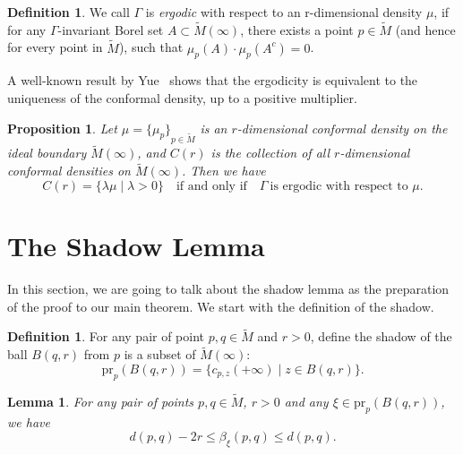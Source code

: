 \documentclass[reqno,11pt]{article}
\newtheorem{proposition}[theorem]{Proposition}
\newtheorem{lemma}[theorem]{Lemma}
\theoremstyle{definition}
\newtheorem{definition}[theorem]{Definition}
\theoremstyle{remark}
\numberwithin{equation}{section}
\begin{document}
\begin{definition}
	We call $\Gamma$ is \emph{ergodic} with respect to an r-dimensional density $\mu$, if for any $\Gamma$-invariant Borel set $A\subset\widetilde{M}(\infty)$, there exists a point $p\in\widetilde{M}$ (and hence for every point in $\widetilde{M}$), such that $\mu_p(A)\cdot\mu_p(A^{c})=0$.
\end{definition}

A well-known result by Yue~\cite{Yue1} shows that the ergodicity is equivalent to the uniqueness of the conformal density, up to a positive multiplier.

\begin{proposition}\label{prop_3_6}
	Let $\mu={\{\mu_p\}}_{p\in\widetilde{M}}$ is an $r$-dimensional conformal density on the ideal boundary $\widetilde{M}(\infty)$, and $C(r)$ is the collection of all $r$-dimensional conformal densities on $\widetilde{M}(\infty)$. Then we have
	\begin{displaymath}
		C(r)=\{\lambda\mu \mid \lambda>0\} \quad \text{if and only if}\quad \Gamma~\text{is ergodic with respect to } \mu.
	\end{displaymath}
\end{proposition}

\section{\bf The Shadow Lemma}\label{sec4}
In this section, we are going to talk about the shadow lemma as the preparation of the proof to our main theorem. We start with the definition of the shadow.

\begin{definition}
	For any pair of point $p,q\in\widetilde{M}$ and $r>0$, define the shadow of the ball $B(q,r)$ from $p$ is a subset of $\widetilde{M}(\infty)$:
	\begin{displaymath}
		\text{pr}_p(B(q,r))=\{c_{p,z}(+\infty)\mid z\in B(q,r)\}.
	\end{displaymath}
\end{definition}

\begin{lemma}\label{lem_4_2}
	For any pair of points $p,q\in\widetilde{M}$, $r>0$ and any $\xi\in\text{pr}_p(B(q,r))$, we have
	\begin{displaymath}
		d(p,q)-2r\leq\beta_\xi(p,q)\leq d(p,q).
	\end{displaymath}
\end{lemma}
\end{document}
